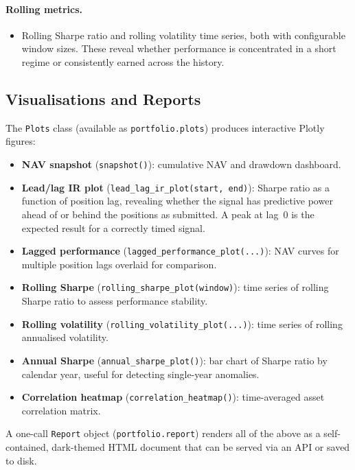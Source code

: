 \documentclass[11pt,a4paper]{article}
\begin{document}
\paragraph{Rolling metrics.}
\begin{itemize}
  \item Rolling Sharpe ratio and rolling volatility time series, both with
    configurable window sizes.  These reveal whether performance is
    concentrated in a short regime or consistently earned across the history.
\end{itemize}

\subsection{Visualisations and Reports}
\label{sec:viz}

The \texttt{Plots} class (available as \texttt{portfolio.plots}) produces
interactive Plotly figures:

\begin{itemize}
  \item \textbf{NAV snapshot} (\texttt{snapshot()}): cumulative NAV and
    drawdown dashboard.
  \item \textbf{Lead/lag IR plot} (\texttt{lead\_lag\_ir\_plot(start, end)}):
    Sharpe ratio as a function of position lag, revealing whether the signal
    has predictive power ahead of or behind the positions as submitted.  A
    peak at lag~0 is the expected result for a correctly timed signal.
  \item \textbf{Lagged performance} (\texttt{lagged\_performance\_plot(...)}):
    NAV curves for multiple position lags overlaid for comparison.
  \item \textbf{Rolling Sharpe} (\texttt{rolling\_sharpe\_plot(window)}): time
    series of rolling Sharpe ratio to assess performance stability.
  \item \textbf{Rolling volatility} (\texttt{rolling\_volatility\_plot(...)}):
    time series of rolling annualised volatility.
  \item \textbf{Annual Sharpe} (\texttt{annual\_sharpe\_plot()}): bar chart of
    Sharpe ratio by calendar year, useful for detecting single-year anomalies.
  \item \textbf{Correlation heatmap} (\texttt{correlation\_heatmap()}):
    time-averaged asset correlation matrix.
\end{itemize}

A one-call \texttt{Report} object (\texttt{portfolio.report}) renders all of
the above as a self-contained, dark-themed HTML document that can be served
via an API or saved to disk.
\end{document}
